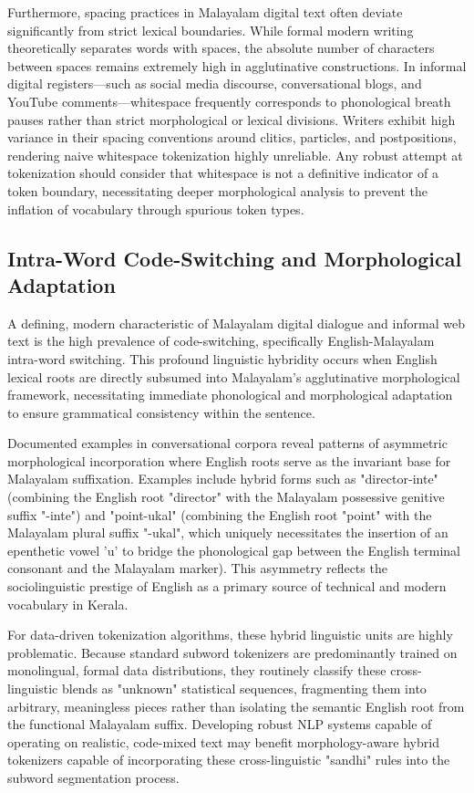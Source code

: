\documentclass[12pt]{article}
\begin{document}
	Furthermore, spacing practices in Malayalam digital text often deviate significantly from strict lexical boundaries. While formal modern writing theoretically separates words with spaces, the absolute number of characters between spaces remains extremely high in agglutinative constructions. In informal digital registers—such as social media discourse, conversational blogs, and YouTube comments—whitespace frequently corresponds to phonological breath pauses rather than strict morphological or lexical divisions. Writers exhibit high variance in their spacing conventions around clitics, particles, and postpositions, rendering naive whitespace tokenization highly unreliable. Any robust attempt at tokenization should consider that whitespace is not a definitive indicator of a token boundary, necessitating deeper morphological analysis to prevent the inflation of vocabulary through spurious token types. \cite{}
	
	\subsection{Intra-Word Code-Switching and Morphological Adaptation }
	
	A defining, modern characteristic of Malayalam digital dialogue and informal web text is the high prevalence of code-switching, specifically English-Malayalam intra-word switching. This profound linguistic hybridity occurs when English lexical roots are directly subsumed into Malayalam's agglutinative morphological framework, necessitating immediate phonological and morphological adaptation to ensure grammatical consistency within the sentence. 
	
	Documented examples in conversational corpora reveal patterns of asymmetric morphological incorporation where English roots serve as the invariant base for Malayalam suffixation. Examples include hybrid forms such as "director-inte" (combining the English root "director" with the Malayalam possessive genitive suffix "-inte") and "point-ukal" (combining the English root "point" with the Malayalam plural suffix "-ukal", which uniquely necessitates the insertion of an epenthetic vowel 'u' to bridge the phonological gap between the English terminal consonant and the Malayalam marker). This asymmetry reflects the sociolinguistic prestige of English as a primary source of technical and modern vocabulary in Kerala. 
	
	For data-driven tokenization algorithms, these hybrid linguistic units are highly problematic. Because standard subword tokenizers are predominantly trained on monolingual, formal data distributions, they routinely classify these cross-linguistic blends as "unknown" statistical sequences, fragmenting them into arbitrary, meaningless pieces rather than isolating the semantic English root from the functional Malayalam suffix. Developing robust NLP systems capable of operating on realistic, code-mixed text may benefit morphology-aware hybrid tokenizers capable of incorporating these cross-linguistic "sandhi" rules into the subword segmentation process. 
	
\end{document}
